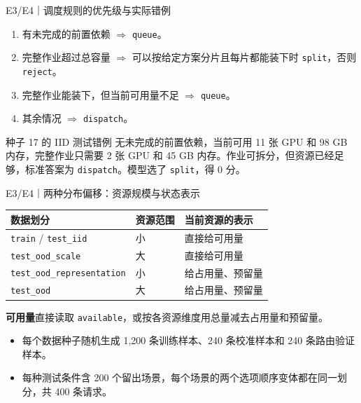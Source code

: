\documentclass{beamer}
\begin{document}
\begin{frame}{E3/E4｜调度规则的优先级与实际错例}
  \small
  \begin{enumerate}
    \item 有未完成的前置依赖 $\Rightarrow$ \texttt{queue}。
    \item 完整作业超过总容量 $\Rightarrow$ 可以按给定方案分片且每片都能装下时 \texttt{split}，否则 \texttt{reject}。
    \item 完整作业能装下，但当前可用量不足 $\Rightarrow$ \texttt{queue}。
    \item 其余情况 $\Rightarrow$ \texttt{dispatch}。
  \end{enumerate}
  \begin{block}{种子 17 的 IID 测试错例}
    无未完成的前置依赖，当前可用 11 张 GPU 和 98 GB 内存，完整作业只需要 2 张 GPU 和 45 GB 内存。作业可拆分，但资源已经足够，标准答案为 \texttt{dispatch}。模型选了 \texttt{split}，得 0 分。
  \end{block}
\end{frame}

\begin{frame}{E3/E4｜两种分布偏移：资源规模与状态表示}
  \small
  \centering
  \begin{tabular}{@{}lll@{}}
    \toprule
    \textbf{数据划分} & \textbf{资源范围} & \textbf{当前资源的表示}\\
    \midrule
    \texttt{train} / \texttt{test\_iid} & 小 & 直接给可用量\\
    \texttt{test\_ood\_scale} & 大 & 直接给可用量\\
    \texttt{test\_ood\_representation} & 小 & 给占用量、预留量\\
    \texttt{test\_ood} & 大 & 给占用量、预留量\\
    \bottomrule
  \end{tabular}

  \medskip
  \raggedright
  \textbf{可用量}\quad 直接读取 \texttt{available}，或按各资源维度用总量减去占用量和预留量。
  \begin{itemize}
    \item 每个数据种子随机生成 1,200 条训练样本、240 条校准样本和 240 条路由验证样本。
    \item 每种测试条件含 200 个留出场景，每个场景的两个选项顺序变体都在同一划分，共 400 条请求。
  \end{itemize}
\end{frame}
\end{document}
